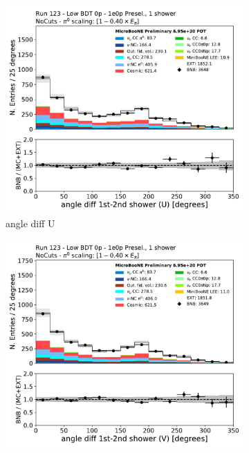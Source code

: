 \begin{figure}[H]
    \centering
    \begin{subfigure}{0.3\textwidth}
    \includegraphics[width=1.0\textwidth]{1e0p/Low_BDT_Sideband/anglediff_U.pdf}
    \caption{angle diff U}
    \end{subfigure}
    \begin{subfigure}{0.3\textwidth}
    \includegraphics[width=1.0\textwidth]{1e0p/Low_BDT_Sideband/anglediff_V.pdf}

\end{subfigure}
\end{figure}
